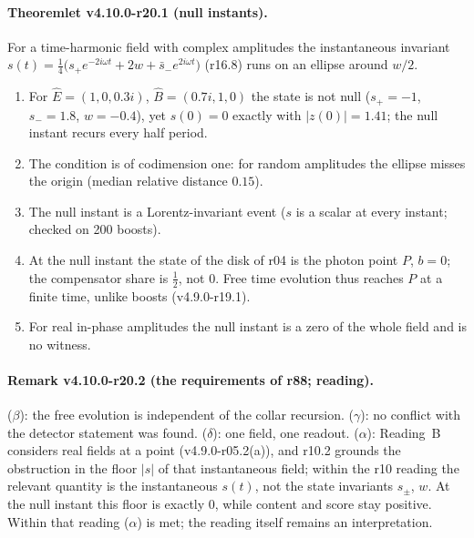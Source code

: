 \paragraph{Theoremlet v4.10.0-r20.1 (null instants).}
For a time-harmonic field with complex amplitudes the instantaneous invariant \(s(t)=\tfrac14\bigl(s_+e^{-2i\omega t}+2w+\bar s_-e^{2i\omega t}\bigr)\)
(r16.8) runs on an ellipse around \(w/2\).
\begin{enumerate}[leftmargin=2em]
\item[(a)] For \(\hat E=(1,0,0.3i)\), \(\hat B=(0.7i,1,0)\) the state is not null (\(s_+=-1\), \(s_-=1.8\), \(w=-0.4\)), yet \(s(0)=0\) exactly with
\(|z(0)|=1.41\); the null instant recurs every half period.
\item[(b)] The condition is of codimension one: for random amplitudes the ellipse misses the origin (median relative distance \(0.15\)).
\item[(c)] The null instant is a Lorentz-invariant event (\(s\) is a scalar at every instant; checked on 200 boosts).
\item[(d)] At the null instant the state of the disk of r04 is the photon point \(P\), \(b=0\); the compensator share is \(\tfrac12\), not \(0\).  Free time
evolution thus reaches \(P\) at a finite time, unlike boosts (v4.9.0-r19.1).
\item[(e)] For real in-phase amplitudes the null instant is a zero of the whole field and is no witness.
\end{enumerate}

\paragraph{Remark v4.10.0-r20.2 (the requirements of r88; reading).}
(\(\beta\)): the free evolution is independent of the collar recursion.  (\(\gamma\)): no conflict with the detector statement was found.
(\(\delta\)): one field, one readout.  (\(\alpha\)): Reading~B considers real fields at a point (v4.9.0-r05.2(a)), and r10.2 grounds the
obstruction in the floor \(|s|\) of that instantaneous field; within the r10 reading the relevant quantity is the instantaneous \(s(t)\),
not the state invariants \(s_\pm\), \(w\).  At the null instant this floor is exactly \(0\), while content and score stay positive.  Within
that reading (\(\alpha\)) is met; the reading itself remains an interpretation.

